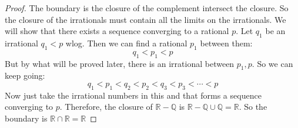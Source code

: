 \documentclass{article}
\begin{document}
\begin{proof}
        The boundary is the closure of the complement intersect the closure. So the closure of the irrationals must contain all the limits on the irrationals. We will show that there exists a sequence converging to a rational $p$. Let $q_{1}$ be an irrational $q_{1} < p$ wlog. Then we can find a rational $p_{1}$ between them:
            \begin{equation*}
                q_{1} < p_{1} < p
            \end{equation*}
        But by what will be proved later, there is an irrational between $p_{1}, p$. So we can keep going:
            \begin{equation*}
                q_{1} < p_{1} < q_{2} < p_{2} < q_{3} < p_{3} < \cdots < p
            \end{equation*}
        Now just take the irrational numbers in this and that forms a sequence converging to $p$. Therefore, the closure of $\mathbb{R} - \mathbb{Q}$ is $\mathbb{R} - \mathbb{Q} \cup \mathbb{Q} = \mathbb{R}$. So the boundary is $\mathbb{R} \cap \mathbb{R} = \mathbb{R}$


\end{proof}
\end{document}
